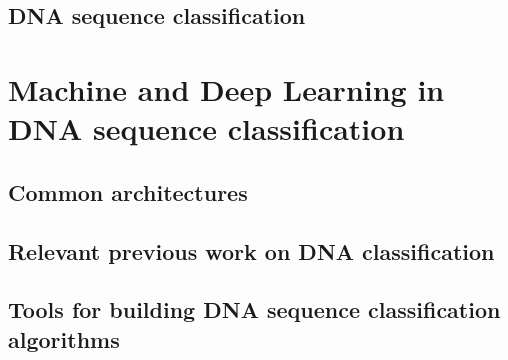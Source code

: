 \subsection{DNA sequence classification}


\section{Machine and Deep Learning in DNA sequence classification} \label{sec:ml_dl_dna}

\subsection{Common architectures}

\subsection{Relevant previous work on DNA classification}

\subsection{Tools for building DNA sequence classification algorithms}

